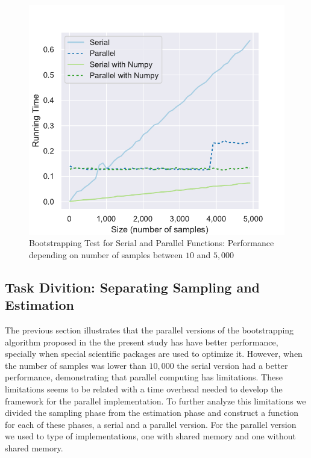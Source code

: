 \documentclass[11pt]{article}
\begin{document}
\begin{figure}[H]
    \begin{center}
        \includegraphics{serialvsparallel_small_test.pdf}
    \end{center}
    \caption{Bootstrapping Test for Serial and Parallel Functions: Performance depending on number of samples between $10$ and $5,000$}\label{fig:SerialVSParallelSmallTest}
\end{figure}

\subsection{Task Divition: Separating Sampling and Estimation}\label{subsec:task-divition:-separating-sampling-and-estimation}

The previous section illustrates that the parallel versions of the bootstrapping algorithm proposed in the the present study
has have better performance, specially when special scientific packages are used to optimize it. However, when the number
of samples was lower than $10,000$ the serial version had a better performance, demonstrating that parallel computing has
limitations. These limitations seems to be related with a time overhead needed to develop the framework
for the parallel implementation. To further analyze this limitations we divided the
sampling phase from the estimation phase and construct a function for each of these phases, a serial and a parallel version.
For the parallel version we used to type of implementations, one with shared memory and one without shared memory.
\end{document}
